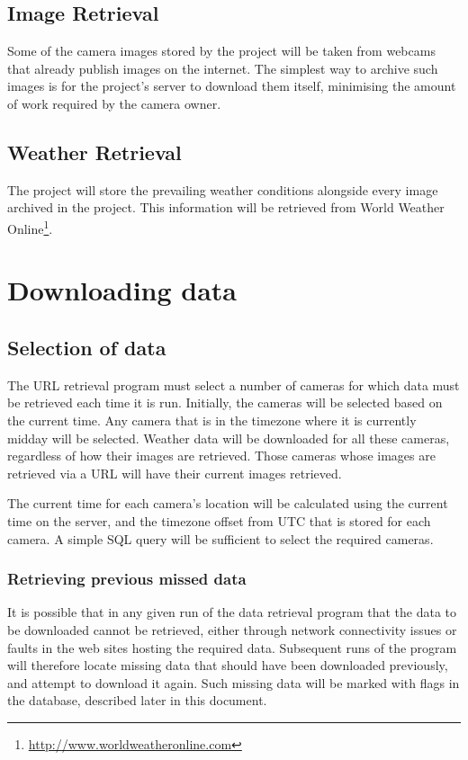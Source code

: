 \documentclass[11pt]{article}
\begin{document}
\subsection{Image Retrieval}
Some of the camera images stored by the project will be taken from webcams that already publish images on the internet. The simplest way to archive such images is for the project's server to download them itself, minimising the amount of work required by the camera owner.

\subsection{Weather Retrieval}
The project will store the prevailing weather conditions alongside every image archived in the project. This information will be retrieved from World Weather Online\footnote{\protect\url{http://www.worldweatheronline.com}}.

\section{Downloading data}
\subsection{Selection of data}
The URL retrieval program must select a number of cameras for which data must be retrieved each time it is run. Initially, the cameras will be selected based on the current time. Any camera that is in the timezone where it is currently midday will be selected. Weather data will be downloaded for all these cameras, regardless of how their images are retrieved. Those cameras whose images are retrieved via a URL will have their current images retrieved.

The current time for each camera's location will be calculated using the current time on the server, and the timezone offset from UTC that is stored for each camera. A simple SQL query will be sufficient to select the required cameras.

\subsubsection{Retrieving previous missed data}
It is possible that in any given run of the data retrieval program that the data to be downloaded cannot be retrieved, either through network connectivity issues or faults in the web sites hosting the required data. Subsequent runs of the program will therefore locate missing data that should have been downloaded previously, and attempt to download it again. Such missing data will be marked with flags in the database, described later in this document.
\end{document}
